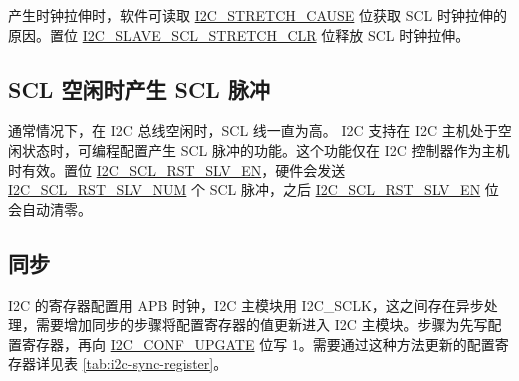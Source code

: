 \documentclass[main\_\_CN.tex]{subfiles}
\begin{document}
产生时钟拉伸时，软件可读取 \hyperref[fielddesc:I2CSTRETCHCAUSE]{I2C\_STRETCH\_CAUSE} 位获取 SCL 时钟拉伸的原因。置位 \hyperref[fielddesc:I2CSLAVESCLSTRETCHCLR]{I2C\_SLAVE\_SCL\_STRETCH\_CLR} 位释放 SCL 时钟拉伸。

\subsection{SCL 空闲时产生 SCL 脉冲}

通常情况下，在 I2C 总线空闲时，SCL 线一直为高。\chipname{} I2C 支持在 I2C 主机处于空闲状态时，可编程配置产生 SCL 脉冲的功能。这个功能仅在 I2C 控制器作为主机时有效。置位 \hyperref[fielddesc:I2CSCLRSTSLVEN]{I2C\_SCL\_RST\_SLV\_EN}，硬件会发送 \hyperref[fielddesc:I2CSCLRSTSLVNUM]{I2C\_SCL\_RST\_SLV\_NUM} 个 SCL 脉冲，之后 \hyperref[fielddesc:I2CSCLRSTSLVEN]{I2C\_SCL\_RST\_SLV\_EN} 位会自动清零。

\subsection{同步}

I2C 的寄存器配置用 APB 时钟，I2C 主模块用 I2C\_SCLK，这之间存在异步处理，需要增加同步的步骤将配置寄存器的值更新进入 I2C 主模块。步骤为先写配置寄存器，再向 \hyperref[fielddesc:I2CCONFUPGATE]{I2C\_CONF\_UPGATE} 位写 1。需要通过这种方法更新的配置寄存器详见表 \ref{tab:i2c-sync-register}。
\end{document}
